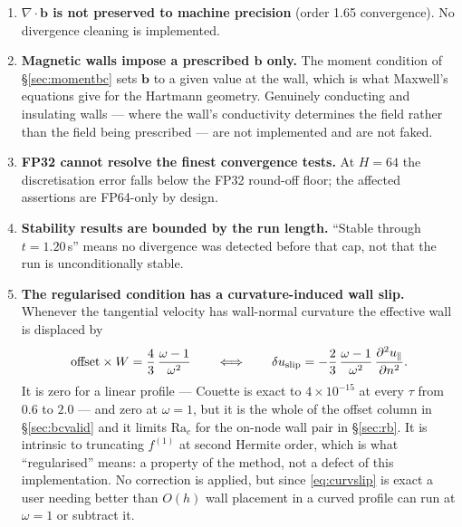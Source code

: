 \documentclass[11pt,a4paper]{article}
\newcommand{\bb}{\bm{b}}
\newcommand{\e}[1]{\times 10^{#1}}
\begin{document}
\begin{enumerate}[leftmargin=1.4em,itemsep=4pt]
\item \textbf{$\nabla\!\cdot\!\bb$ is not preserved to machine precision}
  (order 1.65 convergence). No divergence cleaning is implemented.

\item \textbf{Magnetic walls impose a prescribed $\bb$ only.} The moment
  condition of \S\ref{sec:momentbc} sets $\bb$ to a given value at the wall,
  which is what Maxwell's equations give for the Hartmann geometry. Genuinely
  conducting and insulating walls --- where the wall's conductivity determines
  the field rather than the field being prescribed --- are not implemented and
  are not faked.

\item \textbf{FP32 cannot resolve the finest convergence tests.} At $H=64$ the
  discretisation error falls below the FP32 round-off floor; the affected
  assertions are FP64-only by design.

\item \textbf{Stability results are bounded by the run length.} ``Stable through
  $t=1.20$\,s'' means no divergence was detected before that cap, not that the run
  is unconditionally stable.

\item \textbf{The regularised condition has a curvature-induced wall slip.}
  Whenever the tangential velocity has wall-normal curvature the effective wall
  is displaced by
  \begin{equation}
    \text{offset}\times W = \frac{4}{3}\,\frac{\omega-1}{\omega^{2}}
    \qquad\Longleftrightarrow\qquad
    \delta u_{\rm slip} = -\frac23\,\frac{\omega-1}{\omega^2}
                          \,\frac{\partial^2u_\parallel}{\partial n^2}.
    \label{eq:curvslip2}
  \end{equation}
  It is zero for a linear profile --- Couette is exact to $4\e{-15}$ at every
  $\tau$ from $0.6$ to $2.0$ --- and zero at $\omega=1$, but it is the whole of
  the offset column in \S\ref{sec:bcvalid} and it limits $\mathrm{Ra}_c$ for the
  on-node wall pair in \S\ref{sec:rb}. It is intrinsic to truncating $f^{(1)}$ at
  second Hermite order, which is what ``regularised'' means: a property of the
  method, not a defect of this implementation. No correction is applied, but
  since \eqref{eq:curvslip} is exact a user needing better than $O(h)$ wall
  placement in a curved profile can run at $\omega=1$ or subtract it.


\end{enumerate}
\end{document}
